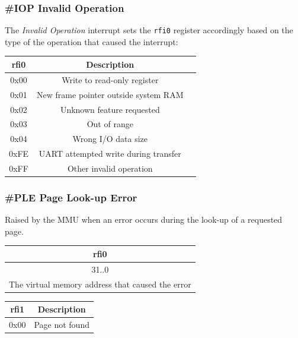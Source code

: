 \documentclass[a4paper,10pt]{article}
\begin{document}
\subsubsection{\#IOP Invalid Operation} \label {ir:IOP}
The \emph{Invalid Operation} interrupt sets the \verb|rfi0| register accordingly based on the type of the operation that caused the interrupt:

\begin{table}[H]
	\centering
	{
		\begin{tabular}{|c|c|c|}
\hline
rfi0 & Description \\
\hline
0x00 & Write to read-only register \\
\hline
0x01 & New frame pointer outside system RAM \\
\hline
0x02 & Unknown feature requested \\
\hline
0x03 & Out of range \\
\hline
0x04 & Wrong I/O data size \\
\hline
0xFE & UART attempted write during transfer \\
\hline
0xFF & Other invalid operation \\
\hline
		\end{tabular}
	}
\end{table}

\subsubsection{\#PLE Page Look-up Error} \label {ir:PLE}
Raised by the MMU when an error occurs during the look-up of a requested page.

\begin{table}[H]
	\centering
	{
		\begin{tabular}{|c|}
\hline
rfi0 \\
\hline
31..0 \\
\hline
The virtual memory address that caused the error \\
\hline
		\end{tabular}
	}
\end{table}

\begin{table}[H]
	\centering
	{
		\begin{tabular}{|c|c|}
\hline
rfi1 & Description \\
\hline
0x00 & Page not found \\
\hline
		\end{tabular}
	}
\end{table}
\end{document}
